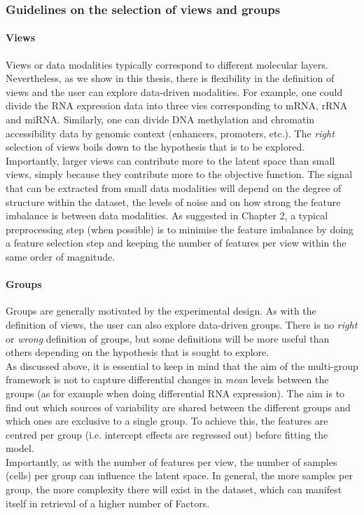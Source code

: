 \subsubsection{Guidelines on the selection of views and groups} \label{section:mofa2_guidelines_views_groups}

\paragraph{Views}
Views or data modalities typically correspond to different molecular layers. Nevertheless, as we show in this thesis, there is flexibility in the definition of views and the user can explore data-driven modalities. For example, one could divide the RNA expression data into three vies corresponding to mRNA, rRNA and miRNA. Similarly, one can divide DNA methylation and chromatin accessibility data by genomic context (enhancers, promoters, etc.). The \textit{right} selection of views boils down to the hypothesis that is to be explored.\\ 
Importantly, larger views can contribute more to the latent space than small views, simply because they contribute more to the objective function. The signal that can be extracted from small data modalities will depend on the degree of structure within the dataset, the levels of noise and on how strong the feature imbalance is between data modalities. As suggested in Chapter 2, a typical preprocessing step (when possible) is to minimise the feature imbalance by doing a feature selection step and keeping the number of features per view within the same order of magnitude.

\paragraph{Groups}
Groups are generally motivated by the experimental design.
As with the definition of views, the user can also explore data-driven groups. There is no \textit{right} or \textit{wrong} definition of groups, but some definitions will be more useful than others depending on the hypothesis that is sought to explore.\\
As discussed above, it is essential to keep in mind that the aim of the multi-group framework is not to capture differential changes in \textit{mean} levels between the groups (as for example when doing differential RNA expression). The aim is to find out which sources of variability are shared between the different groups and which ones are exclusive to a single group. To achieve this, the features are centred per group (i.e. intercept effects are regressed out) before fitting the model.\\
Importantly, as with the number of features per view, the number of samples (cells) per group can influence the latent space. In general, the more samples per group, the more complexity there will exist in the dataset, which can manifest itself in retrieval of a higher number of Factors.


